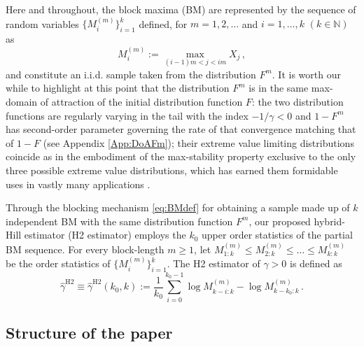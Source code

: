 \documentclass[11pt, a4paper, oneside]{article}
\numberwithin{equation}{section}
\theoremstyle{plain}
\theoremstyle{definition}
\newcommand{\sumab}[2]{\ensuremath{\sum\limits_{#1}^{#2}}}
\begin{document}
Here and throughout, the block maxima (BM) are represented by the sequence of random variables $\{M_{i}^{(m)}\}_{i=1}^k$ defined, for $m= 1, 2, \ldots$ and $i= 1, \ldots, k$ $(k \in \mathbb{N})$ as
\begin{equation}\label{eq:BMdef}
    M_{i}^{(m)} :=\mathop{\max}\limits_{(i-1)m<j<im}X_{j}\,,
\end{equation}
and constitute an i.i.d. sample taken from the distribution $F^m $.
It is worth our while to highlight at this point that the distribution $F^{m}$ is in the same max-domain of attraction of the initial distribution function $F$: the two distribution functions are regularly varying in the tail with the index $-1/\gamma <0$ and $1-F^m$ has second-order parameter governing the rate of that convergence matching that of $1-F$ (see Appendix \ref{App:DoAFm}); their extreme value limiting distributions coincide as in the embodiment of the max-stability property exclusive to the only three possible extreme value distributions, which has earned them formidable uses in vastly many applications  \citep{Beirlantetal2004,Resnick2007,ReissThomas2008}. %

Through the blocking mechanism \eqref{eq:BMdef} for obtaining a sample made up of $k$ independent BM with the same distribution function $F^m$, our proposed hybrid-Hill estimator (H2 estimator) employs the $k_0$ upper order statistics of the partial BM sequence. For every block-length $m \geq 1$, let $M^{(m)}_{1:k} \leq M^{(m)}_{2:k} \leq \ldots \leq M^{(m)}_{k:k}$ be the order statistics of $\{M_{i}^{(m)}\}_{i=1}^k$. The H2 estimator of $\gamma >0$ is defined as
\begin{equation}\label{eq:HibHill}
    \hat{\gamma}^{\textrm{H2}} \equiv  \hat{\gamma}^{\textrm{H2}}(k_0,k) := \frac{1}{k_0} \sumab{i=0}{k_0-1} \log M^{(m)}_{k-i:k} -\log M^{(m)}_{k-k_0:k}\, .
\end{equation}



\subsection{Structure of the paper}\label{SSec:Struct}
\end{document}
